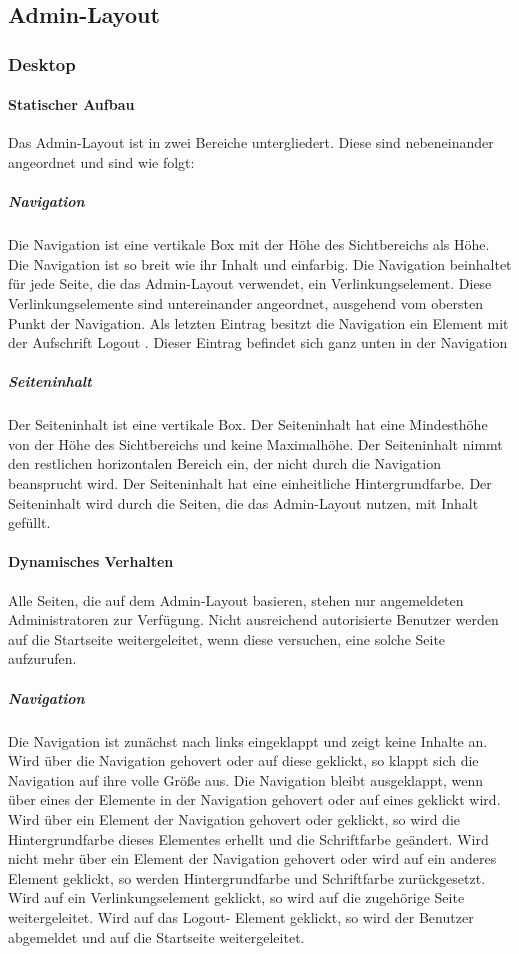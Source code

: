 \subsection{Admin-Layout}

\subsubsection{Desktop}
\paragraph*{Statischer Aufbau}
Das Admin-Layout ist in zwei Bereiche untergliedert. Diese sind nebeneinander angeordnet und sind wie folgt:

\subparagraph*{Navigation}
Die Navigation ist eine vertikale Box mit der Höhe des Sichtbereichs als Höhe.
Die Navigation ist so breit wie ihr Inhalt und einfarbig.
Die Navigation beinhaltet für jede Seite, die das Admin-Layout verwendet, ein Verlinkungselement. 
Diese Verlinkungselemente sind untereinander angeordnet, ausgehend vom obersten Punkt der Navigation.
Als letzten Eintrag besitzt die Navigation ein Element mit der Aufschrift \dq Logout \dq. Dieser Eintrag befindet sich ganz unten in der Navigation

\subparagraph*{Seiteninhalt}
Der Seiteninhalt ist eine vertikale Box. Der Seiteninhalt hat eine Mindesthöhe von der Höhe des Sichtbereichs und keine Maximalhöhe.
Der Seiteninhalt nimmt den restlichen horizontalen Bereich ein, der nicht durch die Navigation beansprucht wird.
Der Seiteninhalt hat eine einheitliche Hintergrundfarbe.
Der Seiteninhalt wird durch die Seiten, die das Admin-Layout nutzen, mit Inhalt gefüllt.

\paragraph*{Dynamisches Verhalten}
Alle Seiten, die auf dem Admin-Layout basieren, stehen nur angemeldeten Administratoren zur Verfügung. 
Nicht ausreichend autorisierte Benutzer werden auf die Startseite weitergeleitet, wenn diese versuchen, eine solche Seite aufzurufen.

\subparagraph*{Navigation}
Die Navigation ist zunächst nach links eingeklappt und zeigt keine Inhalte an. Wird über die Navigation gehovert oder auf diese geklickt,
so klappt sich die Navigation auf ihre volle Größe aus. Die Navigation bleibt ausgeklappt, wenn über eines der Elemente in der Navigation gehovert oder auf eines geklickt wird.
Wird über ein Element der Navigation gehovert oder geklickt, so wird die Hintergrundfarbe dieses Elementes erhellt und die Schriftfarbe geändert.
Wird nicht mehr über ein Element der Navigation gehovert oder wird auf ein anderes Element geklickt, so werden Hintergrundfarbe und Schriftfarbe zurückgesetzt.
Wird auf ein Verlinkungselement geklickt, so wird auf die zugehörige Seite weitergeleitet.
Wird auf das \dq Logout\dq - Element geklickt, so wird der Benutzer abgemeldet und auf die Startseite weitergeleitet.

